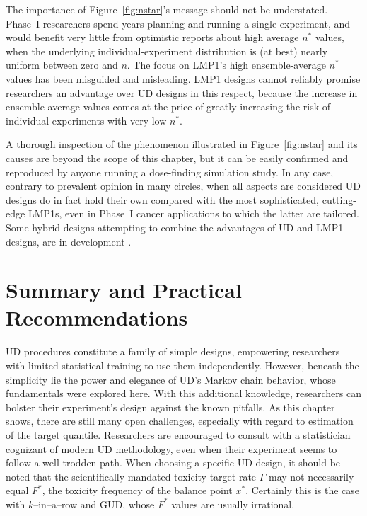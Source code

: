 The importance of Figure~\ref{fig:nstar}'s message  should not be understated.  Phase~I researchers spend years planning and running a single experiment, and would benefit very little from optimistic reports about high average $n^*$ values, when the underlying individual-experiment distribution is (at best) nearly uniform between zero and $n$. The focus on LMP1's high ensemble-average $n^*$ values has been misguided and misleading. LMP1 designs cannot reliably promise researchers an advantage over UD designs in this respect, because the increase in ensemble-average values comes at the price of greatly increasing the risk of individual experiments with very low $n^*$.

A thorough inspection of the phenomenon illustrated in Figure~\ref{fig:nstar} and its causes are beyond the scope of this chapter, but it can be easily confirmed and reproduced by anyone running a dose-finding simulation study. In any case, contrary to prevalent opinion in many circles, when all aspects are considered UD designs do in fact hold their own compared with the most sophisticated, cutting-edge LMP1s, even in  Phase~I cancer applications to which the latter are tailored. Some hybrid designs attempting to combine the advantages of UD and LMP1 designs, are in development \citep[Ch.~5]{Oron07}.


\chapter{Summary and Practical Recommendations}\label{sec:summary}

UD procedures constitute a family of simple designs, empowering researchers with limited statistical training to use them independently. However, beneath the simplicity lie the power and elegance of UD's Markov chain behavior, whose fundamentals were explored here. With this additional knowledge, researchers can bolster their experiment's design against the known pitfalls. As this chapter shows, there are still many open challenges, especially with regard to estimation of the target quantile. Researchers are encouraged to consult with a statistician cognizant of modern UD methodology, even when their experiment seems to follow a well-trodden path. When choosing a specific UD design, it should be noted that the scientifically-mandated toxicity target rate $\Gamma$ may not necessarily equal $F^*$, the toxicity frequency of the balance point $x^*$. Certainly this is the case with $k$--in--a--row and GUD, whose $F^*$ values are usually irrational.

